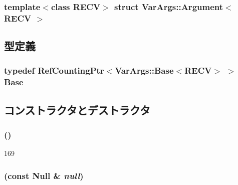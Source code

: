 \subsubsection*{template$<$class RECV$>$ struct VarArgs::Argument$<$ RECV $>$}



\subsection{型定義}
\hypertarget{structVarArgs_1_1Argument_ade0d195165b441ade8d9d192eb0623b8}{
\subsubsection[{Base}]{\setlength{\rightskip}{0pt plus 5cm}typedef {\bf RefCountingPtr}$<${\bf VarArgs::Base}$<$RECV$>$ $>$ {\bf Base}}}
\label{structVarArgs_1_1Argument_ade0d195165b441ade8d9d192eb0623b8}


\subsection{コンストラクタとデストラクタ}
\hypertarget{structVarArgs_1_1Argument_aedc8c00f523413f83bf6652cbd05bf30}{
\subsubsection[{Argument}]{ ()}}
\label{structVarArgs_1_1Argument_aedc8c00f523413f83bf6652cbd05bf30}



\begin{DoxyCode}
169 { }
\end{DoxyCode}
\hypertarget{structVarArgs_1_1Argument_ab9a66e116a24e629db197d6df650b5fc}{
\subsubsection[{Argument}]{ (const {\bf Null} \& {\em null})}}
\label{structVarArgs_1_1Argument_ab9a66e116a24e629db197d6df650b5fc}



